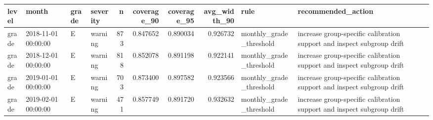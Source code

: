 \begin{tabular}{llllrrrrll}
\toprule
level & month & grade & severity & n & coverage_90 & coverage_95 & avg_width_90 & rule & recommended_action \\
\midrule
grade & 2018-11-01 00:00:00 & E & warning & 873 & 0.847652 & 0.890034 & 0.926732 & monthly_grade_threshold & increase group-specific calibration support and inspect subgroup drift \\
grade & 2018-12-01 00:00:00 & E & warning & 818 & 0.852078 & 0.891198 & 0.922141 & monthly_grade_threshold & increase group-specific calibration support and inspect subgroup drift \\
grade & 2019-01-01 00:00:00 & E & warning & 703 & 0.873400 & 0.897582 & 0.923566 & monthly_grade_threshold & increase group-specific calibration support and inspect subgroup drift \\
grade & 2019-02-01 00:00:00 & E & warning & 471 & 0.857749 & 0.891720 & 0.932632 & monthly_grade_threshold & increase group-specific calibration support and inspect subgroup drift \\
\bottomrule
\end{tabular}
